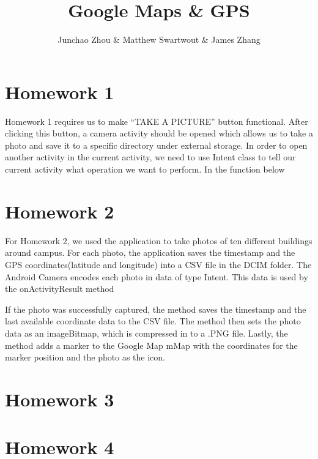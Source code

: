 \documentclass[]{article}
\title{Google Maps \& GPS}
\author{Junchao Zhou & Matthew Swartwout & James Zhang }
\begin{document}
\maketitle

\section{Homework 1}
Homework 1 requires us to make “TAKE A PICTURE” button functional. After clicking this button, a camera activity should be opened which allows us to take a photo and save it to a specific directory under external storage. 
In order to open another activity in the current activity, we need to use Intent class to tell our current activity what operation we want to perform. In the function below
\section{Homework 2}
For Homework 2, we used the application to take photos of ten different buildings around campus. For each photo, the application saves the timestamp and the GPS coordinates(latitude and longitude) into a CSV file in the DCIM folder. The Android Camera encodes each photo in data of type Intent. This data is used by the onActivityResult method

If the photo was successfully captured, the method saves the timestamp and the last available coordinate data to the CSV file. The method then sets the photo data as an imageBitmap, which is compressed in to a .PNG file. Lastly, the method adds a marker to the Google Map mMap with the coordinates for the marker position and the photo as the icon.
\section{Homework 3}
\section{Homework 4}
\end{document}
